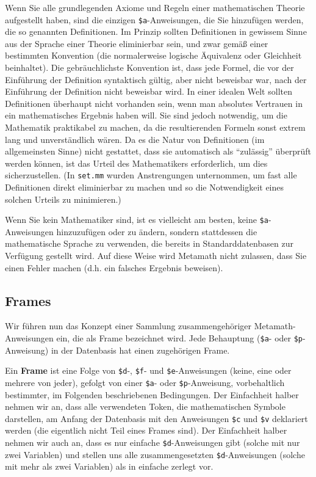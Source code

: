 Wenn Sie alle grundlegenden Axiome und Regeln einer mathematischen Theorie aufgestellt haben, sind die einzigen \texttt{\$a}-Anweisungen, die Sie hinzufügen werden, die so genannten Definitionen.  Im Prinzip sollten Definitionen in gewissem Sinne aus der Sprache einer Theorie eliminierbar sein, und zwar gemäß einer bestimmten Konvention (die normalerweise logische Äquivalenz oder Gleichheit beinhaltet).  Die gebräuchlichste Konvention ist, dass jede Formel, die vor der Einführung der Definition syntaktisch gültig, aber nicht beweisbar war, nach der Einführung der Definition nicht beweisbar wird.  In einer idealen Welt sollten Definitionen überhaupt nicht vorhanden sein, wenn man absolutes Vertrauen in ein mathematisches Ergebnis haben will.  Sie sind jedoch notwendig, um die Mathematik praktikabel zu machen, da die resultierenden Formeln sonst extrem lang und unverständlich wären.  Da es die Natur von Definitionen (im allgemeinsten Sinne) nicht gestattet, dass sie automatisch als "`zulässig"' überprüft werden können, ist das Urteil des Mathematikers erforderlich, um dies sicherzustellen.  (In \texttt{set.mm} wurden Anstrengungen unternommen, um fast alle Definitionen direkt eliminierbar zu machen und so die Notwendigkeit eines solchen Urteils zu minimieren.)

Wenn Sie kein Mathematiker sind, ist es vielleicht am besten, keine \texttt{\$a}-Anweisungen hinzuzufügen oder zu ändern, sondern stattdessen die mathematische Sprache zu verwenden, die bereits in Standarddatenbasen zur Verfügung gestellt wird.  Auf diese Weise wird Metamath nicht zulassen, dass Sie einen Fehler machen (d.h. ein falsches Ergebnis beweisen).

\subsection{Frames}\label{frames}

Wir führen nun das Konzept einer Sammlung zusammengehöriger Metamath-Anweisungen ein, die als Frame bezeichnet wird.  Jede Behauptung (\texttt{\$a}- oder \texttt{\$p}-Anweisung) in der Datenbasis hat einen zugehörigen Frame.

Ein {\bf Frame} ist eine Folge von \texttt{\$d}-, \texttt{\$f}- und \texttt{\$e}-Anweisungen (keine, eine oder mehrere von jeder), gefolgt von einer \texttt{\$a}- oder \texttt{\$p}-Anweisung, vorbehaltlich bestimmter, im Folgenden beschriebenen Bedingungen.  Der Einfachheit halber nehmen wir an, dass alle verwendeten Token, die mathematischen Symbole darstellen, am Anfang der Datenbasis mit den Anweisungen \texttt{\$c} und \texttt{\$v} deklariert werden (die eigentlich nicht Teil eines Frames sind).  Der Einfachheit halber nehmen wir auch an, dass es nur einfache \texttt{\$d}-Anweisungen gibt (solche mit nur zwei Variablen) und stellen uns alle zusammengesetzten \texttt{\$d}-Anweisungen (solche mit mehr als zwei Variablen) als in einfache zerlegt vor.

